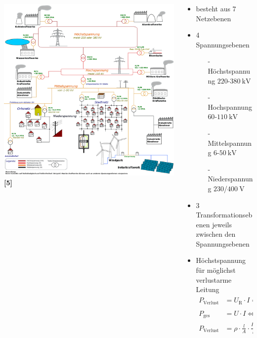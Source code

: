 \documentclass[aspectratio=1610, professionalfonts, 9pt]{beamer}
\begin{document}
{
\begin{frame}
  \begin{columns}
\begin{column}{0.6\textwidth}
  \includegraphics[width=1\textwidth]{images/Stromversorgung.png} \textbf{\textcolor{tugreen}{[5]}}
\end{column}
\begin{column}{0.4\textwidth}
  \begin{itemize}
    \item besteht aus \num{7} Netzebenen
    \item \num{4} Spannungsebenen
    \begin{itemize}
      \item[-] Höchstspannung $\num{220}$-$\SI{380}{\kilo\volt}$
      \item[-] Hochspannung  $\num{60}$-$\SI{110}{\kilo\volt}$
      \item[-] Mittelspannung  $\num{6}$-$\SI{50}{\kilo\volt}$
      \item[-] Niederspannung $\num{230}$/$\SI{400}{\volt}$
    \end{itemize}
    \item \num{3} Transformationsebenen jeweils zwischen den Spannungsebenen
    \item Höchstspannung für möglichst verlustarme Leitung
          \begin{align*}
P_{\text{Verlust}}&= U_\text{R}\cdot I = R \cdot I^2 = \rho\cdot\frac{l}{A} \cdot I^2  \\
P_\text{ges}&=U\cdot I \Leftrightarrow I=\frac{P_\text{ges}}{U}\\
P_{\text{Verlust}}&=\rho\cdot\frac{l}{A} \cdot \frac{P_\text{ges}^2}{U^2}
          \end{align*}

  \end{itemize}
\end{column}
\end{columns}
\end{frame}
}
\end{document}
